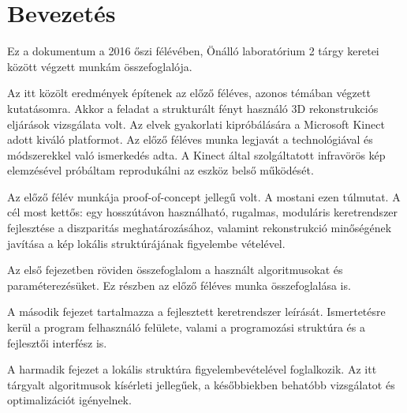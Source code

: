 \chapter*{Bevezetés}

Ez a dokumentum a 2016 őszi félévében, Önálló laboratórium 2 tárgy keretei között végzett munkám összefoglalója.

Az itt közölt eredmények építenek az előző féléves, azonos témában végzett kutatásomra.
Akkor a feladat a strukturált fényt használó 3D rekonstrukciós eljárások vizsgálata volt.
Az elvek gyakorlati kipróbálására a Microsoft Kinect adott kiváló platformot.
Az előző féléves munka legjavát a technológiával és módszerekkel való ismerkedés adta.
A Kinect által szolgáltatott infravörös kép elemzésével próbáltam reprodukálni az eszköz belső működését.

Az előző félév munkája proof-of-concept jellegű volt.
A mostani ezen túlmutat.
A cél most kettős: egy hosszútávon használható, rugalmas, moduláris keretrendszer fejlesztése a diszparitás meghatározásához, valamint rekonstrukció minőségének javítása a kép lokális struktúrájának figyelembe vételével.

Az első fejezetben röviden összefoglalom a használt algoritmusokat és paraméterezésüket.
Ez részben az előző féléves munka összefoglalása is.

A második fejezet tartalmazza a fejlesztett keretrendszer leírását.
Ismertetésre kerül a program felhasználó felülete, valami a programozási struktúra és a fejlesztői interfész is.

A harmadik fejezet a lokális struktúra figyelembevételével foglalkozik.
Az itt tárgyalt algoritmusok kísérleti jellegűek, a későbbiekben behatóbb vizsgálatot és optimalizációt igényelnek.